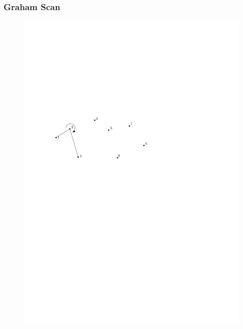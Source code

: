 \begin{frame}
	\frametitle{{Graham Scan}}
\begin{figure}[htbp]
	\begin{center}
  	\includegraphics[width=.8\linewidth]{bilder/graham2}
	\end{center}
\end{figure}
\end{frame}


